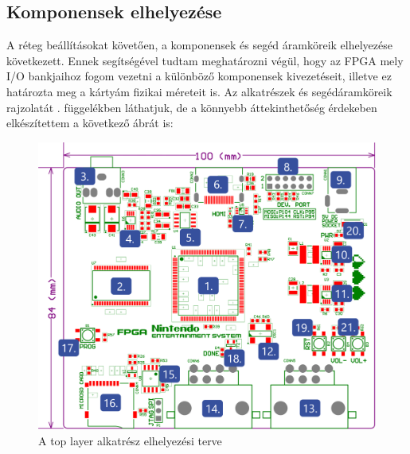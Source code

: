 	\subsection{Komponensek elhelyezése}
	
	A réteg beállításokat követően, a komponensek és segéd áramköreik elhelyezése következett. Ennek segítségével tudtam meghatározni végül, hogy az FPGA mely I/O bankjaihoz fogom vezetni a különböző komponensek kivezetéseit, illetve ez határozta meg a kártyám fizikai méreteit is. Az alkatrészek és segédáramköreik rajzolatát . függelékben láthatjuk, de a könnyebb áttekinthetőség érdekeben elkészítettem a következő ábrát is:
	
	\begin{figure}[H]
		\centering
		\includegraphics[width=135mm, keepaspectratio]{figures/components-top}
		\caption{A top layer alkatrész elhelyezési terve} 
		\label{fig:NES-components-top}
	\end{figure}
	
